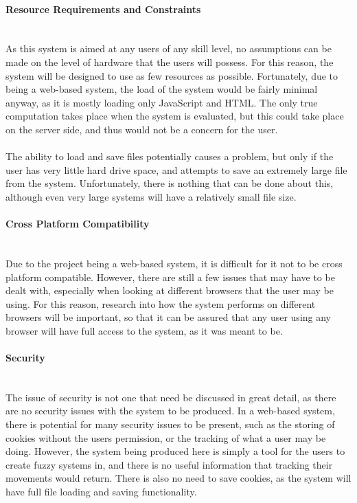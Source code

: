 \paragraph{Resource Requirements and Constraints}\ \\
As this system is aimed at any users of any skill level, no assumptions can be made on the level of hardware that the users will possess. For this reason, the system will be designed to use as few resources as possible. Fortunately, due to being a web-based system, the load of the system would be fairly minimal anyway, as it is mostly loading only JavaScript and HTML. The only true computation takes place when the system is evaluated, but this could take place on the server side, and thus would not be a concern for the user.\ \\
\ \\
The ability to load and save files potentially causes a problem, but only if the user has very little hard drive space, and attempts to save an extremely large file from the system. Unfortunately, there is nothing that can be done about this, although even very large systems will have a relatively small file size.


\paragraph{Cross Platform Compatibility}\ \\
Due to the project being a web-based system, it is difficult for it not to be cross platform compatible. However, there are still a few issues that may have to be dealt with, especially when looking at different browsers that the user may be using. For this reason, research into how the system performs on different browsers will be important, so that it can be assured that any user using any browser will have full access to the system, as it was meant to be.

\paragraph{Security}\ \\
The issue of security is not one that need be discussed in great detail, as there are no security issues with the system to be produced. In a web-based system, there is potential for many security issues to be present, such as the storing of cookies without the users permission, or the tracking of what a user may be doing. However, the system being produced here is simply a tool for the users to create fuzzy systems in, and there is no useful information that tracking their movements would return. There is also no need to save cookies, as the system will have full file loading and saving functionality.

